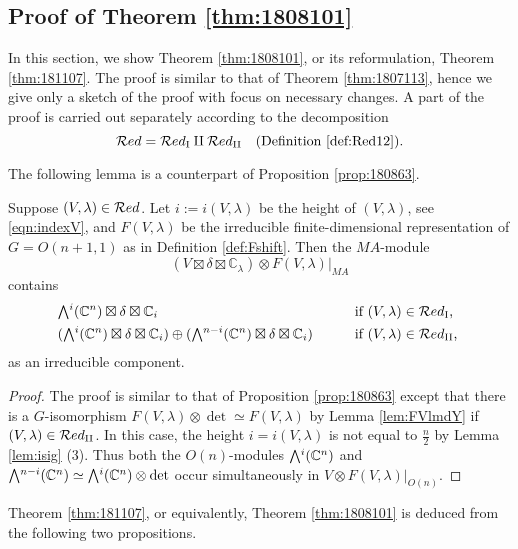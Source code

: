 \subsection{Proof of Theorem \ref{thm:1808101}}
\label{subsec:pf168}
In this section,
 we show Theorem \ref{thm:1808101}, 
 or its reformulation,
 Theorem \ref{thm:181107}.  
The proof is similar 
 to that of Theorem \ref{thm:1807113}, 
 hence we give only a sketch
 of the proof with focus on necessary changes.  
A part of the proof is carried out
 separately
 according to the decomposition 
\[
{\mathcal{R}}ed = {\mathcal{R}}ed_{\operatorname{I}} \amalg {\mathcal{R}}ed_{\operatorname{I I}}
\quad
\text{(Definition \ref{def:Red12})}.  
\]



The following lemma is a counterpart 
 of Proposition \ref{prop:180863}.  
\begin{lemma}
\label{lem:1808101}
Suppose $(V, \lambda) \in {\mathcal{R}}ed$.  
Let $i:=i(V,\lambda)$ be the height 
 of $(V,\lambda)$, 
 see \eqref{eqn:indexV}, 
 and $F(V,\lambda)$ be the irreducible
 finite-dimensional representation 
 of $G=O(n+1,1)$
 as in Definition \ref{def:Fshift}.  
Then the $M A$-module
\[
  (V \boxtimes \delta \boxtimes {\mathbb{C}}_{\lambda})
 \otimes 
 F(V, \lambda)|_{M A}
\]
contains
\begin{alignat*}{2}
& \Exterior^i({\mathbb{C}}^n) \boxtimes \delta \boxtimes {\mathbb{C}}_i
&&
\text{if $(V,\lambda) \in \RedI$, }
\\
& (\Exterior^i({\mathbb{C}}^n) \boxtimes \delta \boxtimes {\mathbb{C}}_i)
 \oplus 
(\Exterior^{n-i}({\mathbb{C}}^n) \boxtimes \delta \boxtimes {\mathbb{C}}_i)
\qquad
&&
\text{if $(V,\lambda) \in \RedJ$, }
\end{alignat*}
 as an irreducible component.  
\end{lemma}
\begin{proof}
The proof is similar to that of Proposition \ref{prop:180863}
 except that there is a $G$-isomorphism
 $F(V, \lambda) \otimes \det \simeq F(V, \lambda)$
 by Lemma \ref{lem:FVlmdY}
 if $(V,\lambda) \in {\mathcal{R}}ed_{\operatorname{I I}}$.  
In this case, 
 the height $i=i(V,\lambda)$ is not equal to $\frac n 2$
 by Lemma \ref{lem:isig} (3).  
Thus both the $O(n)$-modules 
$
 \Exterior^i({\mathbb{C}}^n)
$
 and 
$
   \Exterior^{n-i}({\mathbb{C}}^n) 
   \simeq 
   \Exterior^{i}({\mathbb{C}}^n) \otimes \det
$
 occur simultaneously 
 in $V \otimes F(V,\lambda)|_{O(n)}$.  
\end{proof}

Theorem \ref{thm:181107}, 
 or equivalently, 
 Theorem \ref{thm:1808101}
 is deduced from the following two propositions.  

